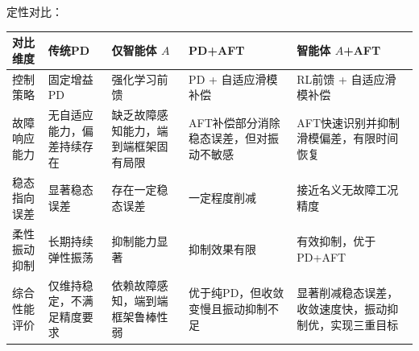 定性对比：

\begin{table}[htbp]
    \centering
    \label{tab:control_schemes_comparison}
    \small
    \begin{tabular}{p{2.3cm} p{2.3cm} p{2.8cm} p{2.8cm} p{3.2cm}}
    \toprule
    \textbf{对比维度} & \textbf{传统PD} & \textbf{仅智能体 $A$} & \textbf{PD+AFT} & \textbf{智能体 $A$+AFT} \\
    \midrule
    控制策略 & 固定增益PD & 强化学习前馈 & PD + 自适应滑模补偿 & RL前馈 + 自适应滑模补偿 \\
    \midrule
    故障响应能力 & 无自适应能力，偏差持续存在 & 缺乏故障感知能力，端到端框架固有局限 & AFT补偿部分消除稳态误差，但对振动不敏感 & AFT快速识别并抑制滑模偏差，有限时间恢复 \\
    \midrule
    稳态指向误差 & 显著稳态误差 & 存在一定稳态误差 & 一定程度削减 & 接近名义无故障工况精度 \\
    \midrule
    柔性振动抑制 & 长期持续弹性振荡 & 抑制能力显著 & 抑制效果有限 & 有效抑制，优于PD+AFT \\
    \midrule
    综合性能评价 & 仅维持稳定，不满足精度要求 & 依赖故障感知，端到端框架鲁棒性弱 & 优于纯PD，但收敛变慢且振动抑制不足 & 显著削减稳态误差，收敛速度快，振动抑制优，实现三重目标 \\
    \bottomrule
    \end{tabular}
\end{table}
